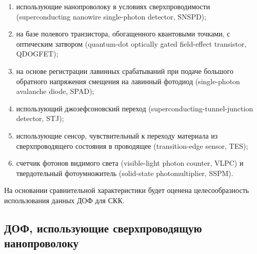 \begin{enumerate}
	\item использующие нанопроволоку в условиях сверхпроводимости (superconducting nanowire single-photon detector, SNSPD);
	\item на базе полевого транзистора, обогащенного квантовыми точками, с оптическим затвором (quantum-dot optically gated field-effect transistor, QDOGFET);
	\item на основе регистрации лавинных срабатываний при подаче большого обратного напряжения смещения на лавинный фотодиод (single-photon avalanche diode, SPAD);
	\item использующий джозефсоновский переход (superconducting-tunnel-junction detector, STJ);
	\item использующие сенсор, чувствительный к переходу материала из сверхпроводящего состояния в проводящее (transition-edge sensor, TES);
	\item счетчик фотонов видимого света (visible-light photon counter, VLPC) и твердотельный фотоумножитель (solid-state photomultiplier, SSPM).
\end{enumerate}

На основании сравнительной характеристики будет оценена целесообразность использования данных ДОФ для СКК.


\subsection{ДОФ, использующие сверхпроводящую нанопроволоку} \label{subsec:ch1/sec5/sub1}

